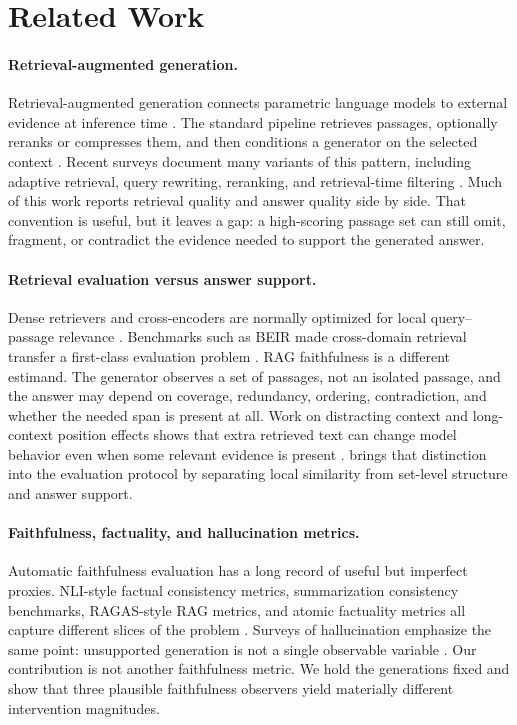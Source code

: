 \section{Related Work}

\paragraph{Retrieval-augmented generation.}
Retrieval-augmented generation connects parametric language models to external
evidence at inference time \citep{lewis2020rag,karpukhin2020dpr}. The standard
pipeline retrieves passages, optionally reranks or compresses them, and then
conditions a generator on the selected context
\citep{nogueira2019passage,glass2022re2g,xu2024recomp,izacard2022atlas}.
Recent surveys document many variants of this pattern, including adaptive
retrieval, query rewriting, reranking, and retrieval-time filtering
\citep{gao2024ragsurvey,chen2024benchmarking}. Much of this work reports
retrieval quality and answer quality side by side. That convention is useful,
but it leaves a gap: a high-scoring passage set can still omit, fragment, or
contradict the evidence needed to support the generated answer.

\paragraph{Retrieval evaluation versus answer support.}
Dense retrievers and cross-encoders are normally optimized for local
query--passage relevance \citep{karpukhin2020dpr,reimers2019sbert,he2021deberta}.
Benchmarks such as BEIR made cross-domain retrieval transfer a first-class
evaluation problem \citep{thakur2021beir}. RAG faithfulness is a different
estimand. The generator observes a set of passages, not an isolated passage,
and the answer may depend on coverage, redundancy, ordering, contradiction,
and whether the needed span is present at all. Work on distracting context and
long-context position effects shows that extra retrieved text can change model
behavior even when some relevant evidence is present
\citep{shi2023large,liu2024lostmiddle}. \method{} brings that distinction into
the evaluation protocol by separating local similarity from set-level
structure and answer support.

\paragraph{Faithfulness, factuality, and hallucination metrics.}
Automatic faithfulness evaluation has a long record of useful but imperfect
proxies. NLI-style factual consistency metrics, summarization consistency
benchmarks, RAGAS-style RAG metrics, and atomic factuality metrics all capture
different slices of the problem
\citep{maynez2020faithfulness,honovich2022true,laban2022summac,es2024ragas,min2023factscore}.
Surveys of hallucination emphasize the same point: unsupported generation is
not a single observable variable \citep{ji2023hallucination}. Our contribution
is not another faithfulness metric. We hold the generations fixed and show that
three plausible faithfulness observers yield materially different intervention
magnitudes.

